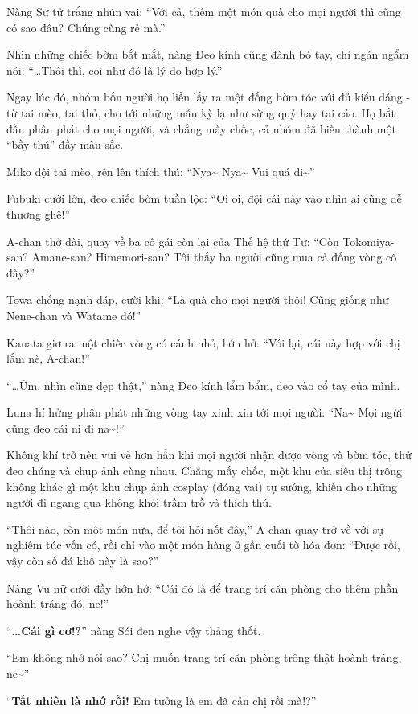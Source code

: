 \documentclass[../main.tex]{subfiles}
\begin{document}
Nàng Sư tử trắng nhún vai: ``Với cả, thêm một món quà cho mọi người thì cũng có sao đâu? Chúng cũng rẻ mà.''

Nhìn những chiếc bờm bắt mắt, nàng Đeo kính cũng đành bó tay, chỉ ngán ngẩm nói: ``\dots Thôi thì, coi như đó là lý do hợp lý.''

Ngay lúc đó, nhóm bốn người họ liền lấy ra một đống bờm tóc với đủ kiểu dáng - từ tai mèo, tai thỏ, cho tới những mẫu kỳ lạ như sừng quỷ hay tai cáo. Họ bắt đầu phân phát cho mọi người, và chẳng mấy chốc, cả nhóm đã biến thành một ``bầy thú'' đầy màu sắc.

Miko đội tai mèo, rên lên thích thú: ``Nya\~{} Nya\~{} Vui quá đi\~{}''

Fubuki cười lớn, đeo chiếc bờm tuần lộc: ``Oi oi, đội cái này vào nhìn ai cũng dễ thương ghê!''

A-chan thở dài, quay về ba cô gái còn lại của Thế hệ thứ Tư: ``Còn Tokomiya-san? Amane-san? Himemori-san? Tôi thấy ba người cũng mua cả đống vòng cổ đấy?''

Towa chống nạnh đáp, cười khì: ``Là quà cho mọi người thôi! Cũng giống như Nene-chan và Watame đó!''

Kanata giơ ra một chiếc vòng có cánh nhỏ, hớn hở: ``Với lại, cái này hợp với chị lắm nè, A-chan!''

``\dots Ừm, nhìn cũng đẹp thật,'' nàng Đeo kính lẩm bẩm, đeo vào cổ tay của mình.

Luna hí hửng phân phát những vòng tay xinh xin tới mọi người: ``Na\~{} Mọi ngừi cũng đeo cái nì đi na\~{}!''

Không khí trở nên vui vẻ hơn hẳn khi mọi người nhận được vòng và bờm tóc, thử đeo chúng và chụp ảnh cùng nhau. Chẳng mấy chốc, một khu của siêu thị trông không khác gì một khu chụp ảnh cosplay (đóng vai) tự sướng, khiến cho những người đi ngang qua không khỏi trầm trồ và thích thú.

``Thôi nào, còn một món nữa, để tôi hỏi nốt đây,'' A-chan quay trở về với sự nghiêm túc vốn có, rồi chỉ vào một món hàng ở gần cuối tờ hóa đơn: ``Được rồi, vậy còn số đá khô này là sao?''

Nàng Vu nữ cười đầy hớn hở: ``Cái đó là để trang trí căn phòng cho thêm phần hoành tráng đó, ne!''

``\textbf{\dots Cái gì cơ!?}'' nàng Sói đen nghe vậy thảng thốt.

``Em không nhớ nói sao? Chị muốn trang trí căn phòng trông thật hoành tráng, ne\~{}''

``\textbf{Tất nhiên là nhớ rồi!} Em tưởng là em đã cản chị rồi mà!?''
\end{document}
